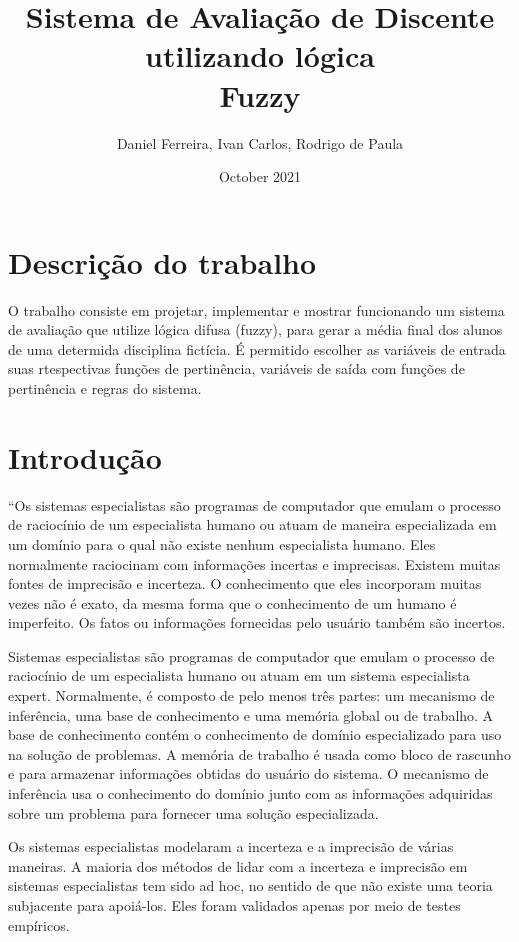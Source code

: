 \documentclass{article}
\title{%
  Sistema de Avaliação de Discente\\
  \large utilizando lógica\\
    Fuzzy}
\author{Daniel Ferreira, Ivan Carlos, Rodrigo de Paula}
\date{October 2021}
\begin{document}
\maketitle

\section{Descrição do trabalho}

O trabalho consiste em projetar, implementar e mostrar
funcionando um sistema de avaliação que utilize lógica difusa
(fuzzy), para gerar a média final dos alunos de uma determida
disciplina fictícia. É permitido escolher as variáveis de
entrada suas rtespectivas funções de pertinência, variáveis de
saída com funções de pertinência e regras do sistema.

\section{Introdução}

``Os sistemas especialistas são programas de computador que
emulam o processo de raciocínio de um especialista humano ou
atuam de maneira especializada em um domínio para o qual não
existe nenhum especialista humano. Eles normalmente raciocinam
com informações incertas e imprecisas. Existem muitas fontes
de imprecisão e incerteza. O conhecimento que eles incorporam
muitas vezes não é exato, da mesma forma que o conhecimento de
um humano é imperfeito. Os fatos ou informações fornecidas
pelo usuário também são incertos.

Sistemas especialistas são programas de computador que emulam
o processo de raciocínio de um especialista humano ou atuam
em um sistema especialista expert. Normalmente, é composto de
pelo menos três partes: um mecanismo de inferência, uma base
de conhecimento e uma memória global ou de trabalho. A base de
conhecimento contém o conhecimento de domínio especializado
para uso na solução de problemas. A memória de trabalho é
usada como bloco de rascunho e para armazenar informações
obtidas do usuário do sistema. O mecanismo de inferência usa o
conhecimento do domínio junto com as informações adquiridas
sobre um problema para fornecer uma solução especializada.

Os sistemas especialistas modelaram a incerteza e a imprecisão
de várias maneiras. A maioria dos métodos de lidar com a
incerteza e imprecisão em sistemas especialistas tem sido ad
hoc, no sentido de que não existe uma teoria subjacente para
apoiá-los. Eles foram validados apenas por meio de testes
empíricos.
\end{document}
